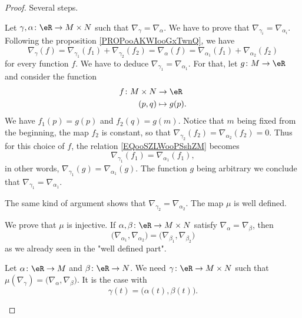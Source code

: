 \begin{proof}
	Several steps.
	\begin{subproof}
		Let \(\gamma,\alpha \colon \eR\to M\times N  \) such that \( \nabla_{\gamma}=\nabla_{\alpha}\). We have to prove that \( \nabla_{\gamma_i}=\nabla_{\alpha_i}\). Following the proposition \ref{PROPooAKWIooGxTwnQ}, we have
		\begin{equation}		\label{EQooSZLWooPSshZM}
			\nabla_{\gamma}(f)=\nabla_{\gamma_1}(f_1)+\nabla_{\gamma_2}(f_2)=\nabla_{\alpha}(f)=\nabla_{\alpha_1}(f_1)+\nabla_{\alpha_2}(f_2)
		\end{equation}
		for every function \( f\). We have to deduce \( \nabla_{\gamma_1}=\nabla_{\alpha_1}\). For that, let \(g \colon M\to \eR  \) and consider the function
		\begin{equation}
			\begin{aligned}
				f\colon M\times N & \to \eR       \\
				(p,q)             & \mapsto g(p).
			\end{aligned}
		\end{equation}
		We have \( f_1(p)=g(p)\) and \( f_2(q)=g(m)\). Notice that \( m\) being fixed from the beginning, the map \( f_2\) is constant, so that \( \nabla_{\gamma_2}(f_2)=\nabla_{\alpha_{2}}(f_2)=0\). Thus for this choice of \( f\), the relation \eqref{EQooSZLWooPSshZM} becomes
		\begin{equation}
			\nabla_{\gamma_1}(f_1)=\nabla_{\alpha_1}(f_1),
		\end{equation}
		in other words, \( \nabla_{\gamma_1}(g)=\nabla_{\alpha_1}(g)\). The function \( g\) being arbitrary we conclude that \( \nabla_{\gamma_1}=\nabla_{\alpha_1}\).

		The same kind of argument shows that \( \nabla_{\gamma_2}=\nabla_{\alpha_2}\). The map \( \mu\) is well defined.

		\spitem[\( \mu\) is injective]
		We prove that \( \mu\) is injective. If \(\alpha,\beta \colon \eR\to M\times N  \) satisfy \( \nabla_{\alpha}=\nabla_{\beta}\), then
		\begin{equation}
			\big( \nabla_{\alpha_1},\nabla_{\alpha_2} \big)=\big( \nabla_{\beta_1},\nabla_{\beta_2} \big)
		\end{equation}
		as we already seen in the "well defined part".

		\spitem[\( \mu\) is surjective]
		Let \(\alpha \colon \eR\to M  \) and \(\beta \colon \eR\to N  \). We need \(\gamma \colon \eR\to M\times N  \) such that \( \mu(\nabla_{\gamma})=\big( \nabla_{\alpha},\nabla_{\beta} \big)\). It is the case with
		\begin{equation}
			\gamma(t)=\big( \alpha(t), \beta(t) \big).
		\end{equation}
	\end{subproof}
\end{proof}


